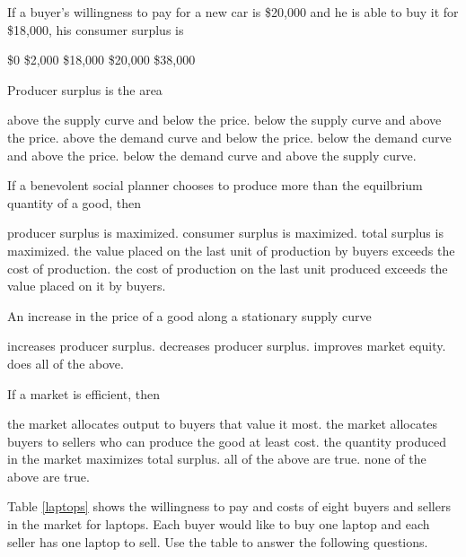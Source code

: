 \documentclass[addpoints,11pt]{exam}
\theoremstyle{definition}
\begin{document}
\begin{questions}
		
\newpage 

\question If a buyer's willingness to pay for a new car is \$20,000 and he is able to buy it for \$18,000, his consumer surplus is 

\begin{choices}
	\choice \$0
	\CorrectChoice \$2,000
	\choice \$18,000
	\choice \$20,000
	\choice \$38,000
\end{choices}

\question Producer surplus is the area

\begin{choices}
	\CorrectChoice above the supply curve and below the price.
	\choice below the supply curve and above the price.
	\choice above the demand curve and below the price.
	\choice below the demand curve and above the price.
	\choice below the demand curve and above the supply curve.
\end{choices}

\question If a benevolent social planner chooses to produce more than the equilbrium quantity of a good, then

\begin{choices}
	\choice producer surplus is maximized.
	\choice consumer surplus is maximized.
	\choice total surplus is maximized.
	\choice the value placed on the last unit of production by buyers exceeds the cost of production.
	\CorrectChoice the cost of production on the last unit produced exceeds the value placed on it by buyers.
\end{choices}

\question An increase in the price of a good along a stationary supply curve

\begin{choices}
	\CorrectChoice increases producer surplus.
	\choice decreases producer surplus.
	\choice improves market equity.
	\choice does all of the above.
\end{choices}

\question If a market is efficient, then 

\begin{choices}
	\choice the market allocates output to buyers that value it most.
	\choice the market allocates buyers to sellers who can produce the good at least cost. 
	\choice the quantity produced in the market maximizes total surplus.
	\CorrectChoice all of the above are true.
	\choice none of the above are true.
\end{choices}
	
		\question Table \ref{laptops} shows the willingness to pay and costs of eight buyers and sellers in the market for laptops. Each buyer would like to buy one laptop and each seller has one laptop to sell. Use the table to answer the following questions.
		\\
		

\end{questions}
\end{document}
